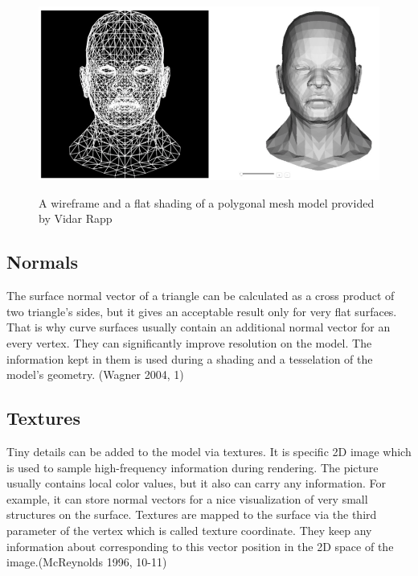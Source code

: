 \documentclass[twoside, english, 11pt]{report}
\begin{document}
\begin{figure}[!h]
\includegraphics[scale=0.55]{img/mesh}\\
\caption{A wireframe and a flat shading of a polygonal mesh model provided by Vidar Rapp\label{fig:mesh}}
\end{figure}

\subsection{Normals}
The surface normal vector of a triangle can be calculated as a cross product of two triangle's sides, but it gives an acceptable result only for very flat surfaces. That is why curve surfaces usually contain an additional normal vector for an every vertex. They can significantly improve resolution on the model. The information kept in them is used during a shading and a tesselation of the model's geometry. (Wagner 2004, 1)\\


\subsection{Textures}
Tiny details can be added to the model via textures. It is specific 2D image which is used to sample high-frequency information during rendering. The picture usually contains local color values, but it also can carry any information. For example, it can store normal vectors for a nice visualization of very small structures on the surface. Textures are mapped to the surface via the third parameter of the vertex which is called texture coordinate. They keep any information about corresponding to this vector position in the 2D space of the image.(McReynolds 1996, 10-11)\\
\end{document}
